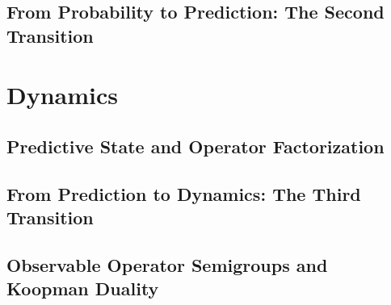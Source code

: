 \documentclass[12pt, oneside]{book}
\theoremstyle{definition}
\theoremstyle{remark}
\begin{document}



\chapter*{From Probability to Prediction: The Second Transition}
\label{interstitial:zero-to-one}



\part{Dynamics}


\chapter{Predictive State and Operator Factorization}
\label{chap:paper-one}




\chapter*{From Prediction to Dynamics: The Third Transition}
\label{interstitial:one-to-two}




\chapter{Observable Operator Semigroups and Koopman Duality}
\label{chap:paper-two}
\end{document}
